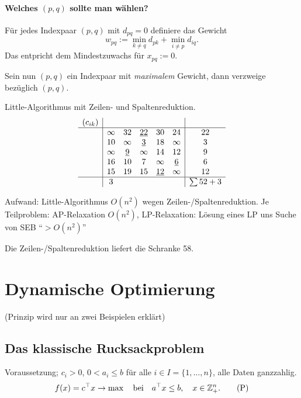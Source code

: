 \paragraph{Welches $(p,q)$ sollte man wählen?}
Für jedes Indexpaar $(p,q)$ mit $d_{pq} = 0$ definiere das Gewicht
\[ w_{pq} := \min_{k \ne q} d_{pk} + \min_{i \ne p} d_{iq}. \]
Das entpricht dem Mindestzuwachs für $x_{pq} := 0$.

Sein nun $(p,q)$ ein Indexpaar mit \emph{maximalem} Gewicht, dann verzweige
bezüglich $(p,q)$.

\begin{exmp}
  Little-Algorithmus mit Zeilen- und Spaltenreduktion.
  \[
    \begin{array}{c|ccccc|c}
      (c_{ik}) & & & & & & \\
      \hline
               & \infty & 32 & \underline{22} & 30 & 24 & 22 \\
               & 10 & \infty & \underline{3} & 18 & \infty & 3 \\
               & \infty & \underline{9} & \infty & 14 & 12 & 9 \\
               & 16 & 10 & 7 & \infty & \underline{6} & 6 \\
               & 15 & 19 & 15 & \underline{12} & \infty & 12 \\
      \hline
               & 3 & & & & & \sum 52 + 3
    \end{array}
  \]
\end{exmp}

Aufwand: Little-Algorithmus $O(n^2)$ wegen Zeilen-/Spaltenreduktion. Je
Teilproblem: AP-Relaxation $O(n^2)$, LP-Relaxation: Lösung eines LP uns Suche
von SEB ``$> O(n^2)$''

\begin{rmrk*}
  Die Zeilen-/Spaltenreduktion liefert die Schranke 58.
\end{rmrk*}

\section{Dynamische Optimierung}
(Prinzip wird nur an zwei Beispielen erklärt)

\subsection{Das klassische Rucksackproblem}
Voraussetzung; $c_i > 0$, $0 < a_i \le b$ für alle $i \in I = \{1, \ldots, n\}$,
alle Daten ganzzahlig.
\[ f(x) = c^\top x \to \max \quad \text{bei} \quad a^\top x \le b, \quad x \in \mathbb{Z}_+^n.
  \tag{P} \]


